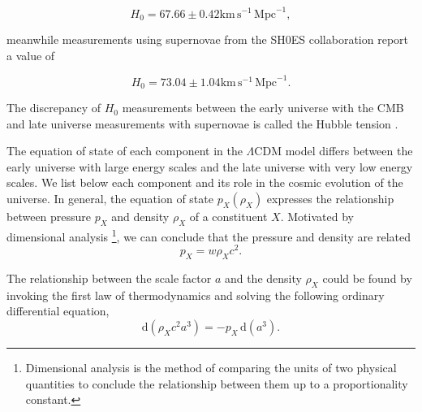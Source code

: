 \begin{equation*}
    H_0 = 67.66 \pm 0.42 \mathrm{km} \, \mathrm{s}^{-1} \, \mathrm{Mpc}^{-1},
\end{equation*}

meanwhile measurements using supernovae from the SH0ES collaboration \citep{riess2022comprehensive} report a value of

\begin{equation*}
    H_0 = 73.04 \pm 1.04 \mathrm{km} \, \mathrm{s}^{-1} \, \mathrm{Mpc}^{-1}.
\end{equation*}

 The discrepancy of $H_0$ measurements between the early universe with the CMB and late universe measurements with supernovae is called the Hubble tension \citep{verde2024tale}. 

The equation of state of each component in the $\Lambda$CDM model differs between the early universe with large energy scales and the late universe with very low energy scales. We list below each component and its role in the cosmic evolution of the universe. In general, the equation of state $p_X(\rho_X)$ expresses the relationship between pressure $p_X$ and density $\rho_X$ of a constituent $X$. Motivated by dimensional analysis \footnote{Dimensional analysis is the method of comparing the units of two physical quantities to conclude the relationship between them up to a proportionality constant.}, we can conclude that the pressure and density are related
\begin{equation}
    p_X = w \rho_X c^2. 
\end{equation}

The relationship between the scale factor $a$ and the density $\rho_X$ could be found by invoking the first law of thermodynamics and solving the following ordinary differential equation,
\begin{equation} \label{eq:adiabatic}
    \mathrm{d}(\rho_X c^2 a^3) = -p_X \, \mathrm{d}(a^3) .
\end{equation}

